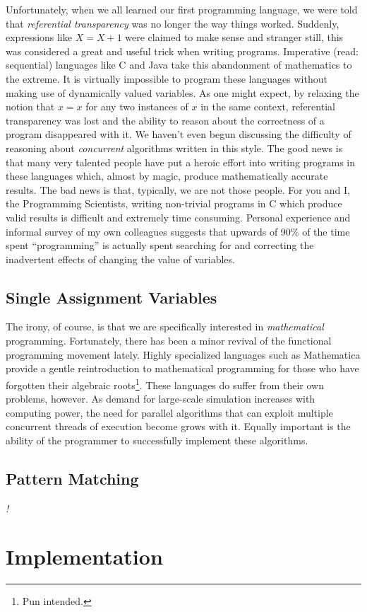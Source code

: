 \documentclass[twocolumn,a4paper,10pt]{article}
\newcommand{\TODO}{{\huge\emph{\color{red}!}}}
\begin{document}
Unfortunately, when we all learned our first programming language, we were told that \emph{referential transparency} was no longer the way things worked. Suddenly, expressions like $X = X + 1$ were claimed to make sense and stranger still, this was considered a great and useful trick when writing programs. Imperative (read: sequential) languages like C and Java take this abandonment of mathematics to the extreme. It is virtually impossible to program these languages without making use of dynamically valued variables. As one might expect, by relaxing the notion that $x = x$ for any two instances of $x$ in the same context, referential transparency was lost and the ability to reason about the correctness of a program disappeared with it. We haven't even begun discussing the difficulty of reasoning about \emph{concurrent} algorithms written in this style. The good news is that many very talented people have put a heroic effort into writing programs in these languages which, almost by magic, produce mathematically accurate results. The bad news is that, typically, we are not those people. For you and I, the Programming Scientists, writing non-trivial programs in C which produce valid results is difficult and extremely time consuming. Personal experience and informal survey of my own colleagues suggests that upwards of 90\% of the time spent ``programming'' is actually spent searching for and correcting the inadvertent effects of changing the value of variables.

\subsection{Single Assignment Variables}
The irony, of course, is that we are specifically interested in \emph{mathematical} programming. Fortunately, there has been a minor revival of the functional programming movement lately. Highly specialized languages such as Mathematica provide a gentle reintroduction to mathematical programming for those who have forgotten their algebraic roots\footnote{Pun intended.}. These languages do suffer from their own problems, however. As demand for large-scale simulation increases with computing power, the need for parallel algorithms that can exploit multiple concurrent threads of execution become grows with it. Equally important is the ability of the programmer to successfully implement these algorithms.

\subsection{Pattern Matching}


\TODO 

\section{Implementation}
\end{document}
